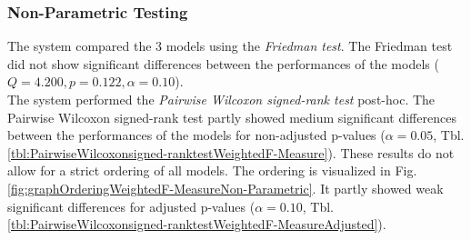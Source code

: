 \documentclass[a4paper,12pt]{article}
\begin{document}
\subsubsection{Non-Parametric Testing}The system compared the 3 models using the \emph{Friedman test}. The Friedman test did not show significant differences between the performances of the models ($Q=4.200, p=0.122, \alpha=0.10$).\\ 

 The system performed the \emph{Pairwise Wilcoxon signed-rank test} post-hoc. The Pairwise Wilcoxon signed-rank test partly showed medium significant differences between the performances of the models for non-adjusted p-values ($\alpha=0.05$, Tbl. \ref{tbl:PairwiseWilcoxonsigned-ranktestWeightedF-Measure}). These results do not allow for a strict ordering of all models. The ordering is visualized in Fig. \ref{fig:graphOrderingWeightedF-MeasureNon-Parametric}. It partly showed weak significant differences for adjusted p-values ($\alpha=0.10$, Tbl. \ref{tbl:PairwiseWilcoxonsigned-ranktestWeightedF-MeasureAdjusted}).

 
\begin{table}[h!]
\centering
{}\caption{P-values from the Pairwise Wilcoxon signed-rank test for Weighted F-Measure}
\label{tbl:PairwiseWilcoxonsigned-ranktestWeightedF-Measure}
\end{table}
\end{document}
